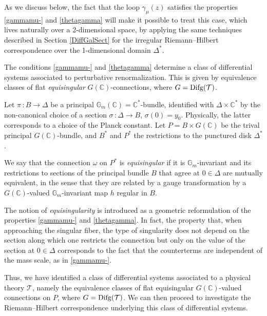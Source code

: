 \documentclass[10pt]{amsart}
\def\C{{\mathbb C}}
\newcommand{\bG}{\mathbb{G}}
\def\sT{{\mathcal T}}
\numberwithin{equation}{section}
\begin{document}
\smallskip

As we discuss below, the fact that the loop $\gamma_\mu(z)$ satisfies
the properties \eqref{gammamu-} and
\eqref{thetagamma} will make it possible to treat this case, which
lives naturally over a 2-dimensional space, by applying the same
techniques described in Section
\ref{DiffGalSect} for the irregular Riemann--Hilbert correspondence
over the 1-dimensional domain $\Delta^*$.

\smallskip

The conditions \eqref{gammamu-} and
\eqref{thetagamma} determine a class of differential systems
associated to perturbative renormalization. This is given by
equivalence classes of flat {\em equisingular} $G(\C)$-connections, where
$G={\rm Difg}(\sT)$.

\smallskip

Let $\pi\,:B\to \Delta$ be a principal $\bG_m(\C)=\C^*$-bundle,
identified with $\Delta \times \C^*$ by the non-canonical choice of a
section $\sigma\,: \Delta \to B$, $\sigma(0)= y_0$. Physically, the
latter corresponds to a choice of the Planck constant. Let
$P=B\times G(\C)$ be the trival principal $G(\C)$-bundle, and $B^*$ and $P^*$
the restrictions to the punctured disk $\Delta^*$.

\smallskip

We say that the  connection $\omega$ on $P^*$ is {\em equisingular} if
it is $\bG_m$-invariant and its restrictions to sections of the
principal bundle $B$ that agree at $0\in \Delta$ are mutually
equivalent, in the sense that they are related by a gauge
transformation by a $G(\C)$-valued $\bG_m$-invariant map $h$ regular in $B$.

\smallskip

The notion of {\em equisingularity} is introduced
as a geometric reformulation of the properties \eqref{gammamu-} and
\eqref{thetagamma}. In fact, the property that, when approaching the
singular fiber, the type of singularity
does not depend on the section along
which one restricts the connection but only on the value of the
section at $0\in \Delta$ corresponds to the fact that the counterterms
are independent of the mass scale, as in \eqref{gammamu-}.

\smallskip

Thus, we have identified a class of differential systems associated to
a physical theory $\sT$, namely the equivalence classes of flat
equisingular $G(\C)$-valued connections on $P$, where $G={\rm
Difg}(\sT)$. We can then proceed to investigate the Riemann--Hilbert
correspondence underlying this class of differential systems.
\end{document}
